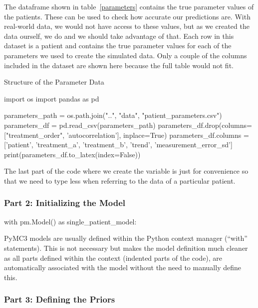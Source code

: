 \documentclass[12pt,a4paper,leqno]{report}
\theoremstyle{plain}
\theoremstyle{definition}
\theoremstyle{remark}
\begin{document}
The  dataframe shown in table\ \ref{parameters} contains the true
parameter values of the patients. These can be used to check how accurate our predictions
are. With real-world data, we would
not have access to these values, but as we created the data ourself, we do and we should
take advantage of that. Each row in this dataset is a patient and contains the
true parameter values for each of the parameters we used to create the simulated data.
Only a couple of the columns included in the dataset are shown here because the full
table would not fit.

\bigskip
\begin{table}[H]
\caption{Structure of the Parameter Data}\label{parameters}
\bigskip
\centering
\begin{pycode}
import os
import pandas as pd

parameters_path = os.path.join("..", "data", "patient_parameters.csv")
parameters_df = pd.read_csv(parameters_path)
parameters_df.drop(columns=["treatment_order", 'autocorrelation'], inplace=True)
parameters_df.columns = ['patient', 'treatment_a', 'treatment_b', 'trend', 'measurement_error_sd']
print(parameters_df.to_latex(index=False))
\end{pycode}
\end{table}
\smallskip

The last part of the code where we create the variable  is just for
convenience so that we need to type less when referring to the data of a particular patient.

\subsubsection*{Part 2: Initializing the Model}

\bigskip
\begin{pyverbatim}[][fontsize=\footnotesize]
with pm.Model() as single_patient_model:
\end{pyverbatim}
\smallskip

PyMC3 models are usually defined within the Python context manager (``with'' statements).
This is not necessary but makes the model definition much cleaner as all parts
defined within the context (indented parts of the code), are automatically associated
with the model without the need to manually define this.

\subsubsection*{Part 3: Defining the Priors}
\end{document}
